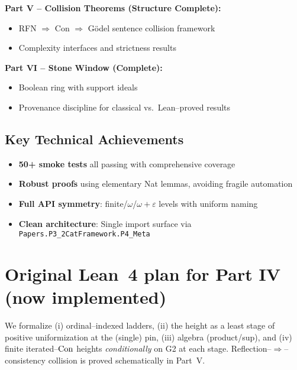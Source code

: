 \documentclass[11pt]{article}
\theoremstyle{definition}
\theoremstyle{remark}
\begin{document}
\textbf{Part V -- Collision Theorems (Structure Complete):}
\begin{itemize}
\item RFN $\Rightarrow$ Con $\Rightarrow$ G\"odel sentence collision framework
\item Complexity interfaces and strictness results
\end{itemize}

\textbf{Part VI -- Stone Window (Complete):}
\begin{itemize}
\item Boolean ring with support ideals
\item Provenance discipline for classical vs.\ Lean--proved results
\end{itemize}

\subsection*{Key Technical Achievements}
\begin{itemize}
\item \textbf{50+ smoke tests} all passing with comprehensive coverage
\item \textbf{Robust proofs} using elementary Nat lemmas, avoiding fragile automation
\item \textbf{Full API symmetry}: finite/$\omega$/$\omega+\varepsilon$ levels with uniform naming
\item \textbf{Clean architecture}: Single import surface via \texttt{Papers.P3\_2CatFramework.P4\_Meta}
\end{itemize}

\section{Original Lean~4 plan for Part IV (now implemented)}

We formalize (i) ordinal–indexed ladders, (ii) the height as a least stage of positive uniformization at the (single) pin, (iii) algebra (product/sup), and (iv) finite iterated--$\mathrm{Con}$ heights \emph{conditionally} on G2 at each stage. Reflection–$\Rightarrow$–consistency collision is proved schematically in Part~V.
\end{document}
